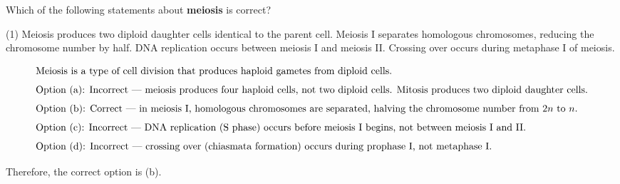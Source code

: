 
\item Which of the following statements about \textbf{meiosis} is correct?

\begin{tasks}(1)
    \task Meiosis produces two diploid daughter cells identical to the parent cell.
    \task Meiosis I separates homologous chromosomes, reducing the chromosome number by half. \ans
    \task DNA replication occurs between meiosis I and meiosis II.
    \task Crossing over occurs during metaphase I of meiosis.
\end{tasks}

\begin{solution}
\begin{align*}
\intertext{Meiosis is a type of cell division that produces haploid gametes from diploid cells.}
\intertext{Option (a): Incorrect — meiosis produces four haploid cells, not two diploid cells. Mitosis produces two diploid daughter cells.}
\intertext{Option (b): Correct — in meiosis I, homologous chromosomes are separated, halving the chromosome number from $2n$ to $n$.}
\intertext{Option (c): Incorrect — DNA replication (S phase) occurs before meiosis I begins, not between meiosis I and II.}
\intertext{Option (d): Incorrect — crossing over (chiasmata formation) occurs during prophase I, not metaphase I.}
\end{align*}

Therefore, the correct option is (b).
\end{solution}
